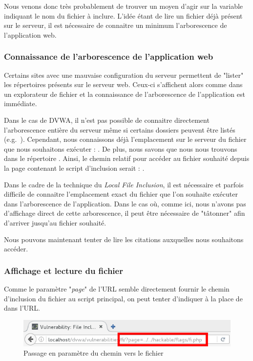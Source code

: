 Nous venons donc très probablement de trouver un moyen d'agir sur la variable indiquant le nom du fichier à inclure. L'idée étant de lire un fichier déjà présent sur le serveur, il est nécessaire de connaitre un minimum l'arborescence de l'application web. 

\subsubsection{Connaissance de l'arborescence de l'application web}
\label{arb}

Certains sites avec une mauvaise configuration du serveur permettent de "lister" les répertoires présents sur le serveur web. Ceux-ci s'affichent alors comme dans un explorateur de fichier et la connaissance de l'arborescence de l'application est immédiate.

Dans le cas de DVWA, il n'est pas possible de connaitre directement l'arborescence entière du serveur même si certains dossiers peuvent être listés (e.g.\ ). Cependant, nous connaissons déjà l'emplacement sur le serveur du fichier que nous souhaitons exécuter : . De plus, nous savons que nous nous trouvons dans le répertoire . Ainsi, le chemin relatif pour accéder au fichier souhaité depuis la page contenant le script d'inclusion serait : .

Dans le cadre de la technique du \textit{Local File Inclusion}, il est nécessaire et parfois difficile de connaitre l'emplacement exact du fichier que l'on souhaite exécuter dans l'arborescence de l'application. Dans le cas où, comme ici, nous n'avons pas d'affichage direct de cette arborescence, il peut être nécessaire de "tâtonner" afin d'arriver jusqu'au fichier souhaité.

Nous pouvons maintenant tenter de lire les citations auxquelles nous souhaitons accéder.

\subsubsection{Affichage et lecture du fichier}


Comme le paramètre "\textit{page}" de l'URL semble directement fournir le chemin d'inclusion du fichier au script principal, on peut tenter d'indiquer  à la place de  dans l'URL.

\begin{figure}[!h]
\begin{center}
\includegraphics[scale=.6]{images/fi3.png}

\caption{Passage en paramètre du chemin vers le fichier}
\label{fi_dvwa3}
\end{center}
\end{figure}


